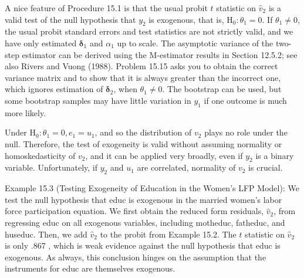 \documentclass[10pt]{article}
\begin{document}
A nice feature of Procedure 15.1 is that the usual probit $t$ statistic on $\hat{v}_{2}$ is a valid test of the null hypothesis that $y_{2}$ is exogenous, that is, $\mathrm{H}_{0}: \theta_{1}=0$. If $\theta_{1} \neq 0$, the usual probit standard errors and test statistics are not strictly valid, and we have only estimated $\boldsymbol{\delta}_{1}$ and $\alpha_{1}$ up to scale. The asymptotic variance of the two-step estimator can be derived using the M-estimator results in Section 12.5.2; see also Rivers and Vuong (1988). Problem 15.15 asks you to obtain the correct variance matrix and to show that it is always greater than the incorrect one, which ignores estimation of $\boldsymbol{\delta}_{2}$, when $\theta_{1} \neq 0$. The bootstrap can be used, but some bootstrap samples may have little variation in $y_{1}$ if one outcome is much more likely.

Under $\mathrm{H}_{0}: \theta_{1}=0, e_{1}=u_{1}$, and so the distribution of $v_{2}$ plays no role under the null. Therefore, the test of exogeneity is valid without assuming normality or homoskedasticity of $v_{2}$, and it can be applied very broadly, even if $y_{2}$ is a binary variable. Unfortunately, if $y_{2}$ and $u_{1}$ are correlated, normality of $v_{2}$ is crucial.

Example 15.3 (Testing Exogeneity of Education in the Women's LFP Model): We test the null hypothesis that educ is exogenous in the married women's labor force participation equation. We first obtain the reduced form residuals, $\hat{v}_{2}$, from regressing educ on all exogenous variables, including motheduc, fatheduc, and huseduc. Then, we add $\hat{v}_{2}$ to the probit from Example 15.2. The $t$ statistic on $\hat{v}_{2}$ is only .867 , which is weak evidence against the null hypothesis that educ is exogenous. As always, this conclusion hinges on the assumption that the instruments for educ are themselves exogenous.
\end{document}
